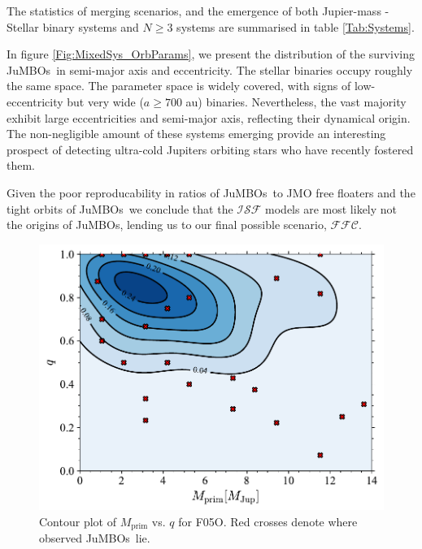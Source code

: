 \documentclass[submission,phys]{lib/SciPost}
\newcommand{\jumbos}{\mbox{JuMBOs}}
\begin{document}
The statistics of merging scenarios, and the emergence of both
Jupier-mass - Stellar binary systems and $N\geq3$ systems are
summarised in table \ref{Tab:Systems}.

In figure \ref{Fig:MixedSys_OrbParams}, we present the distribution of
the surviving \jumbos\, in semi-major axis and eccentricity. The stellar binaries occupy
roughly the same space.  The parameter space is widely covered, with
signs of low-eccentricity but very wide ($a\geq700$ au)
binaries. Nevertheless, the vast majority exhibit large eccentricities
and semi-major axis, reflecting their dynamical origin. The
non-negligible amount of these systems emerging provide an interesting
prospect of detecting ultra-cold Jupiters orbiting stars who have
recently fostered them.

    Given the poor reproducability in ratios of \jumbos\, to JMO free floaters and the tight orbits of \jumbos\, we conclude that the $\mathcal{ISF}$ models are most likely not the origins of \jumbos, lending us to our final possible scenario, $\mathcal{FFC}$.

   \begin{figure}
    \centering
        \includegraphics[width=\columnwidth]{figures/Fractal_rvir0.5_Obs_mass_distr.pdf}
        \caption{Contour plot of $M_{\mathrm{prim}}$ vs. $q$ for F05O. Red crosses denote where observed \jumbos\, lie.}
         \label{Fig:FractalObs_mdistr}
   \end{figure}
   
\end{document}
